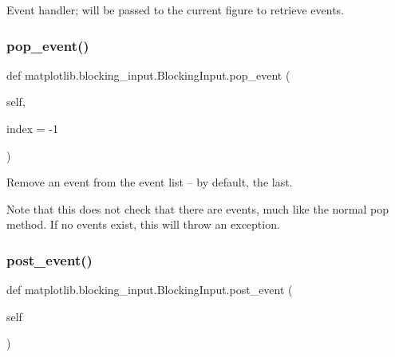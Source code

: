 \begin{DoxyVerb}Event handler; will be passed to the current figure to retrieve events.
\end{DoxyVerb}
 \mbox{\label{classmatplotlib_1_1blocking__input_1_1BlockingInput_a092371bbf637c3d725448bc93b29bb39}} 
\subsubsection{\texorpdfstring{pop\+\_\+event()}{pop\_event()}}
{\footnotesize\ttfamily def matplotlib.\+blocking\+\_\+input.\+Blocking\+Input.\+pop\+\_\+event (\begin{DoxyParamCaption}\item[{}]{self,  }\item[{}]{index = {\ttfamily -\/1} }\end{DoxyParamCaption})}

\begin{DoxyVerb}Remove an event from the event list -- by default, the last.

Note that this does not check that there are events, much like the
normal pop method.  If no events exist, this will throw an exception.
\end{DoxyVerb}
 \mbox{\label{classmatplotlib_1_1blocking__input_1_1BlockingInput_a5e7b5a798392f01df8c7877bf18c5c61}} 
\subsubsection{\texorpdfstring{post\+\_\+event()}{post\_event()}}
{\footnotesize\ttfamily def matplotlib.\+blocking\+\_\+input.\+Blocking\+Input.\+post\+\_\+event (\begin{DoxyParamCaption}\item[{}]{self }\end{DoxyParamCaption})}

